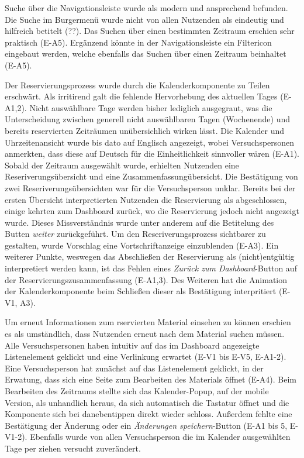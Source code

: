 Suche über die Navigationsleiste wurde als modern und ansprechend befunden. Die
Suche im Burgermenü wurde nicht von allen Nutzenden als eindeutig und hilfreich
betitelt (??). Das Suchen über einen bestimmten Zeitraum erschien sehr praktisch
(E-A5). Ergänzend könnte in der Navigationsleiste ein Filtericon eingebaut
werden, welche ebenfalls das Suchen über einen Zeitraum beinhaltet (E-A5).

Der Reservierungsprozess wurde durch die Kalenderkomponente zu Teilen erschwärt.
Als irritirend galt die fehlende Hervorhebung des aktuellen Tages (E-A1,2).
Nicht auswählbare Tage werden bisher lediglich ausgegraut, was die
Unterscheidung zwischen generell nicht auswählbaren Tagen (Wochenende) und
bereits reservierten Zeiträumen unübersichlich wirken lässt. Die Kalender und
Uhrzeitenansicht wurde bis dato auf Englisch angezeigt, wobei Versuchspersonen
anmerkten, dass diese auf Deutsch für die Einheitlichkeit sinnvoller wären
(E-A1). Sobald der Zeitraum ausgewählt wurde, erhielten Nutzenden eine
Reseriverungsübersicht und eine Zusammenfassungübersicht. Die Bestätigung von
zwei Reseriverungsübersichten war für die Versuchsperson unklar. Bereits bei der
ersten Übersicht interpretierten Nutzenden die Reservierung als abgeschlossen,
einige kehrten zum Dashboard zurück, wo die Reservierung jedoch nicht angezeigt
wurde. Dieses Missverständnis wurde unter anderem auf die Betitelung des Butten
\textit{weiter} zurückgeführt. Um den Reseriverungsprozess sichtbarer zu
gestalten, wurde Vorschlag eine Vortschriftanzeige einzublenden (E-A3). Ein
weiterer Punkte, weswegen das Abschließen der Reservierung als (nicht)entgültig
interpretiert werden kann, ist das Fehlen eines \textit{Zurück zum
  Dashboard}-Button auf der Reservierungszusammenfassung (E-A1,3). Des Weiteren
hat die Animation der Kalenderkomponente beim Schließen dieser als Bestätigung
interpritiert (E-V1, A3).

Um erneut Informationen zum rservierten Material einsehen zu können erschien es
als umständlich, dass Nutzenden erneut nach dem Material suchen müssen. Alle
Versuchspersonen haben intuitiv auf das im Dashboard angezeigte Listenelement
geklickt und eine Verlinkung erwartet (E-V1 bis E-V5, E-A1-2). Eine
Versuchsperson hat zunächst auf das Listenelement geklickt, in der Erwatung,
dass sich eine Seite zum Bearbeiten des Materials öffnet (E-A4). Beim Bearbeiten
des Zeitraums stellte sich das Kalender-Popup, auf der mobile Version, als
unhandlich heraus, da sich automatisch die Tastatur öffnet und die Komponente
sich bei danebentippen direkt wieder schloss. Außerdem fehlte eine Bestätigung
der Änderung oder ein \textit{Änderungen speichern}-Button (E-A1 bis 5, E-V1-2).
Ebenfalls wurde von allen Versuchsperson die im Kalender ausgewählten Tage per
ziehen versucht zuverändert.

